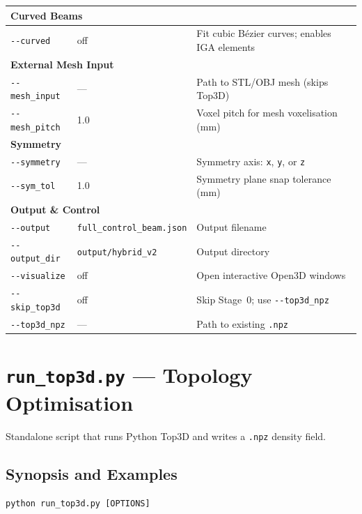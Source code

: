 \documentclass[a4paper, 11pt, openany]{report}
\begin{document}
\begin{longtable}{p{4cm}lp{6cm}}
\multicolumn{3}{l}{\textbf{Curved Beams}} \\
\midrule
\texttt{-{}-curved}       & off   & Fit cubic B\'ezier curves; enables IGA elements \\
\midrule

\multicolumn{3}{l}{\textbf{External Mesh Input}} \\
\midrule
\texttt{-{}-mesh\_input}  & ---   & Path to STL/OBJ mesh (skips Top3D) \\
\texttt{-{}-mesh\_pitch}  & 1.0   & Voxel pitch for mesh voxelisation (mm) \\
\midrule

\multicolumn{3}{l}{\textbf{Symmetry}} \\
\midrule
\texttt{-{}-symmetry}     & ---   & Symmetry axis: \texttt{x}, \texttt{y}, or \texttt{z} \\
\texttt{-{}-sym\_tol}     & 1.0   & Symmetry plane snap tolerance (mm) \\
\midrule

\multicolumn{3}{l}{\textbf{Output \& Control}} \\
\midrule
\texttt{-{}-output}       & \texttt{full\_control\_beam.json} & Output filename \\
\texttt{-{}-output\_dir}  & \texttt{output/hybrid\_v2}        & Output directory \\
\texttt{-{}-visualize}    & off   & Open interactive Open3D windows \\
\texttt{-{}-skip\_top3d}  & off   & Skip Stage~0; use \texttt{-{}-top3d\_npz} \\
\texttt{-{}-top3d\_npz}   & ---   & Path to existing \texttt{.npz} \\

\end{longtable}


\section{\texttt{run\_top3d.py} --- Topology Optimisation}
\label{sec:cli-top3d}

Standalone script that runs Python Top3D and writes a \texttt{.npz} density field.

\subsection{Synopsis and Examples}

\begin{lstlisting}[style=bashstyle]
python run_top3d.py [OPTIONS]
\end{lstlisting}
\end{document}
